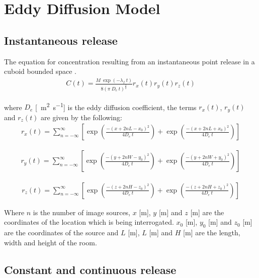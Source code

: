\documentclass[]{article}
\begin{document}
\section{Eddy Diffusion Model}\label{app:eddydiff}

\subsection{Instantaneous release}\label{app:EddyInst}

The equation for concentration resulting from an instantaneous point release in
a cuboid bounded space \cite{drivas96}.
\begin{eqnarray}\label{eq:cuboid-decay-inst}
	C(t) = \frac{M\: \exp(-\lambda_f\:t)}{8(\pi\:D_e\:t)^{\frac{3}{2}}} r_{x}(t)
	r_{y}(t) r_{z}(t)
\end{eqnarray}

where $D_e$ [\SI{}{\meter\squared\per\second}] is the eddy diffusion
coefficient, the terms $r_{x}(t)$, $r_{y}(t)$ and $r_{z}(t)$ are given by the
following:
\begin{eqnarray}
	r_{x}(t) = \sum^{\infty}_{n = -\infty} \left[\exp\left(\frac{-(x + 2nL -
	x_{0})^{2}}{4D_e\:t}\right) + \exp\left(\frac{-(x + 2nL +
	x_{0})^{2}}{4D_e\:t}\right)\right]
\end{eqnarray}

\begin{eqnarray}
	r_{y}(t) = \sum^{\infty}_{n = -\infty} \left[\exp\left(\frac{-(y + 2nW-
	y_{0})^{2}}{4D_e\:t}\right) + \exp\left(\frac{-(y + 2nW +
	y_{0})^{2}}{4D_e\:t}\right)\right]
\end{eqnarray}

\begin{eqnarray}
	r_{z}(t) = \sum^{\infty}_{n = -\infty} \left[\exp\left(\frac{-(z + 2nH -
	z_{0})^{2}}{4D_e\:t}\right) + \exp\left(\frac{-(z + 2nH +
	z_{0})^{2}}{4D_e\:t}\right)\right]
\end{eqnarray}

Where $n$ is the number of image sources, $x$ [m], $y$ [m] and $z$ [m] are the
coordinates of the location which is being interrogated. $x_0$ [m], $y_0$ [m]
and $z_0$ [m] are the coordinates of the source and $L$ [m], $L$ [m] and $H$ [m]
are the length, width and height of the room. 

\subsection{Constant and continuous release}\label{sec:EddyCont}
\end{document}
